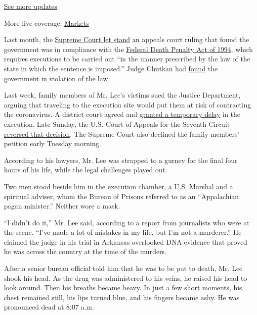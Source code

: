 \href{https://www.nytimes.com/2020/08/01/world/coronavirus-covid-19.html?action=click\&pgtype=Article\&state=default\&region=MAIN_CONTENT_1\&context=storylines_live_updates}{See
more updates}

More live coverage:
\href{https://www.nytimes.com/live/2020/07/31/business/stock-market-today-coronavirus?action=click\&pgtype=Article\&state=default\&region=MAIN_CONTENT_1\&context=storylines_live_updates}{Markets}

Last month, the
\href{https://www.nytimes.com/2020/06/29/us/supreme-court-executions.html}{Supreme
Court let stand} an appeals court ruling that found the government was
in compliance with the
\href{https://www.law.cornell.edu/uscode/text/18/3596}{Federal Death
Penalty Act of 1994}, which requires executions to be carried out ``in
the manner prescribed by the law of the state in which the sentence is
imposed.'' Judge Chutkan had
\href{https://src.bna.com/MZD?_ga=2.258585482.1273884090.1575491003-907374773.1567693399}{found}
the government in violation of the law.

Last week, family members of Mr. Lee's victims sued the Justice
Department, arguing that traveling to the execution site would put them
at risk of contracting the coronavirus. A district court agreed and
\href{https://www.nytimes.com/2020/07/10/us/politics/first-federal-execution-delay.html}{granted
a temporary delay} in the execution. Late Sunday, the U.S. Court of
Appeals for the Seventh Circuit
\href{https://www.nytimes.com/2020/07/12/us/politics/execution-daniel-lewis-lee.html}{reversed
that decision}. The Supreme Court also declined the family members'
petition early Tuesday morning.

According to his lawyers, Mr. Lee was strapped to a gurney for the final
four hours of his life, while the legal challenges played out.

Two men stood beside him in the execution chamber, a U.S. Marshal and a
spiritual adviser, whom the Bureau of Prisons referred to as an
``Appalachian pagan minister.'' Neither wore a mask.

``I didn't do it,'' Mr. Lee said, according to a report from journalists
who were at the scene. ``I've made a lot of mistakes in my life, but I'm
not a murderer.'' He claimed the judge in his trial in Arkansas
overlooked DNA evidence that proved he was across the country at the
time of the murders.

After a senior bureau official told him that he was to be put to death,
Mr. Lee shook his head. As the drug was administered to his veins, he
raised his head to look around. Then his breaths became heavy. In just a
few short moments, his chest remained still, his lips turned blue, and
his fingers became ashy. He was pronounced dead at 8:07 a.m.

